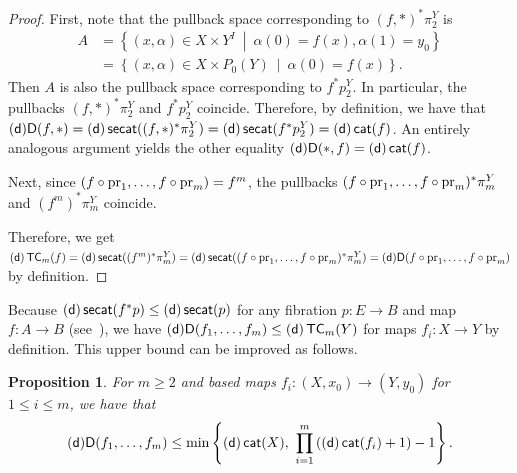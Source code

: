 \documentclass[amscd,amssymb,verbatim,10pt]{amsart}
\numberwithin{equation}{section}
\theoremstyle{plain}
\newtheorem{proposition}[theorem]{Proposition}
\theoremstyle{definition}
\DeclareMathOperator{\cat}{{\mathsf{cat}}}
\DeclareMathOperator{\TC}{{\mathsf{TC}}}
\DeclareMathOperator{\secat}{{\mathsf{secat}}}
\def\pr{\protect\operatorname{pr}}
\newcommand{\D}{{\sf {D}}}
\newcommand{\sd}{{(\sf {d})}}
\begin{document}
\begin{proof}
    First, note that the pullback space corresponding to $(f,\ast)^*\pi^Y_2$ is
    \begin{align*}
        A & = \left\{ (x,\alpha)\in X\times Y^I\ \middle|\ \alpha(0)=f(x),\alpha(1)=y_0 \right\}
        \\
        &=\left\{ (x,\alpha)\in X\times P_0(Y)\ \middle|\ \alpha(0)=f(x) \right\}.
    \end{align*}
    Then $A$ is also the pullback space corresponding to $f^*p^Y_2$. In particular, the pullbacks $(f,\ast)^*\pi^Y_2$ and $f^*p^Y_2$ coincide. Therefore, by definition, we have that $\sd\D(f,\ast)=\sd\secat((f,\ast)^*\pi^Y_2)=\sd\secat(f^*p^Y_2)=\sd\cat(f)$. An entirely analogous argument yields the other equality $\sd\D(\ast,f)=\sd\cat(f)$.
    
    Next, since $(f\circ \pr_1,\dots,f\circ\pr_m)=f^m$, the pullbacks $(f\circ \pr_1,\dots,f\circ\pr_m)^*\pi^Y_m$ and $(f^m)^*\pi^Y_m$ coincide.

    Therefore, we get $\sd\TC_m(f)=\sd\secat((f^m)^*\pi^Y_m)=\sd\secat((f\circ \pr_1,\dots,f\circ\pr_m)^*\pi^Y_m)=\sd\D(f\circ \pr_1,\dots,f\circ\pr_m)$ by definition.
\end{proof}

Because $\sd\secat(f^*p)\le\sd\secat(p)$ for any fibration $p\colon E\to B$ and map $f\colon A\to B$ (see~\cite{Sch,JO}), we have $\sd\D(f_1,\dots,f_m)\le\sd\TC_m(Y)$ for maps $f_i\colon X\to Y$ by definition. This upper bound can be improved as follows.

\begin{proposition}\label{prop: (co)domain}
    For $m\ge 2$ and based maps $f_i\colon (X,x_0)\to (Y,y_0)$ for $1\le i \le m$, we have that
    \[
    \sd\D(f_1,\dots,f_m)\le\min\left\{\sd\cat(X),\ \prod_{i=1}^m\left(\sd\cat(f_i)+1\right)-1\right\}.
    \]
\end{proposition}
\end{document}
